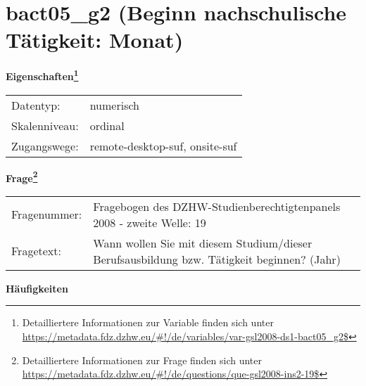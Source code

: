 
    \setcounter{footnote}{0}

    \vspace*{-1.8cm}
	\section{bact05\_g2 (Beginn nachschulische Tätigkeit: Monat)}
	\label{section:bact05_g2}



    \vspace*{0.5cm}
    \noindent\textbf{Eigenschaften\footnote{Detailliertere Informationen zur Variable finden sich unter
		\url{https://metadata.fdz.dzhw.eu/\#!/de/variables/var-gsl2008-ds1-bact05_g2$}}}\\
	\begin{tabularx}{\hsize}{@{}lX}
	Datentyp: & numerisch \\
	Skalenniveau: & ordinal \\
	Zugangswege: &
	  remote-desktop-suf, 
	  onsite-suf
 \\
    \end{tabularx}



				\vspace*{0.5cm}
                \noindent\textbf{Frage\footnote{Detailliertere Informationen zur Frage finden sich unter
		              \url{https://metadata.fdz.dzhw.eu/\#!/de/questions/que-gsl2008-ins2-19$}}}\\
				\begin{tabularx}{\hsize}{@{}lX}
					Fragenummer: &
					  Fragebogen des DZHW-Studienberechtigtenpanels 2008 - zweite Welle:
					  19
 \\
					Fragetext: & Wann wollen Sie mit diesem Studium/dieser Berufsausbildung bzw. Tätigkeit beginnen? (Jahr) \\
				\end{tabularx}





        		\vspace*{0.5cm}
                \noindent\textbf{Häufigkeiten}

